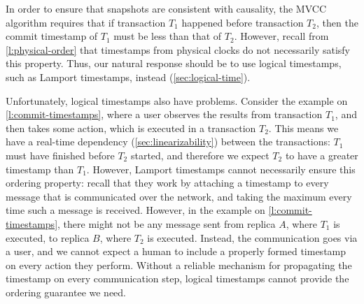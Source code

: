In order to ensure that snapshots are consistent with causality, the MVCC algorithm requires that if transaction $T_1$ happened before transaction $T_2$, then the commit timestamp of $T_1$ must be less than that of $T_2$.
However, recall from \autoref{l:physical-order} that timestamps from physical clocks do not necessarily satisfy this property.
Thus, our natural response should be to use logical timestamps, such as Lamport timestamps, instead (\autoref{sec:logical-time}).

Unfortunately, logical timestamps also have problems.
Consider the example on \autoref{l:commit-timestamps}, where a user observes the results from transaction $T_1$, and then takes some action, which is executed in a transaction $T_2$.
This means we have a real-time dependency (\autoref{sec:linearizability}) between the transactions: $T_1$ must have finished before $T_2$ started, and therefore we expect $T_2$ to have a greater timestamp than $T_1$.
However, Lamport timestamps cannot necessarily ensure this ordering property: recall that they work by attaching a timestamp to every message that is communicated over the network, and taking the maximum every time such a message is received.
However, in the example on \autoref{l:commit-timestamps}, there might not be any message sent from replica $A$, where $T_1$ is executed, to replica $B$, where $T_2$ is executed.
Instead, the communication goes via a user, and we cannot expect a human to include a properly formed timestamp on every action they perform.
Without a reliable mechanism for propagating the timestamp on every communication step, logical timestamps cannot provide the ordering guarantee we need.

